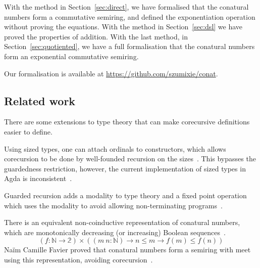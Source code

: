 With the method in Section~\ref{sec:direct}, we have formalised that the
conatural numbers form a commutative semiring, and defined the exponentiation
operation without proving the equations. With the method in
Section~\ref{sec:dsl} we have proved the properties of addition. With the last
method, in Section~\ref{sec:quotiented}, we have a full formalisation that the
conatural numbers form an exponential commutative semiring.

Our formalisation is available at \url{https://github.com/szumixie/conat}.

\subsection{Related work}

There are some extensions to type theory that can make corecursive definitions
easier to define.

Using sized types, one can attach ordinals to constructors, which allows
corecursion to be done by well-founded recursion on the
sizes~\cite{hughes-sized, abel-delay}. This bypasses the guardedness
restriction, however, the current implementation of sized types in Agda is
inconsistent~\cite{abel-agda-sized}.

Guarded recursion adds a modality to type theory and a fixed point operation
which uses the modality to avoid allowing non-terminating
programs~\cite{nakano-modality,atkey-productive}.

There is an equivalent non-coinductive representation of conatural numbers,
which are monotonically decreasing (or increasing) Boolean
sequences~\cite{escardo-infinite}.
\[
  (f : \mathbb{N} \to \mathbb{2}) \times ((m\ n : \mathbb{N}) \to n \le m \to f(m) \le f(n))
\]
Naïm Camille Favier proved that conatural numbers form a semiring with meet
using this representation, avoiding corecursion~\cite{favier-conat}.
